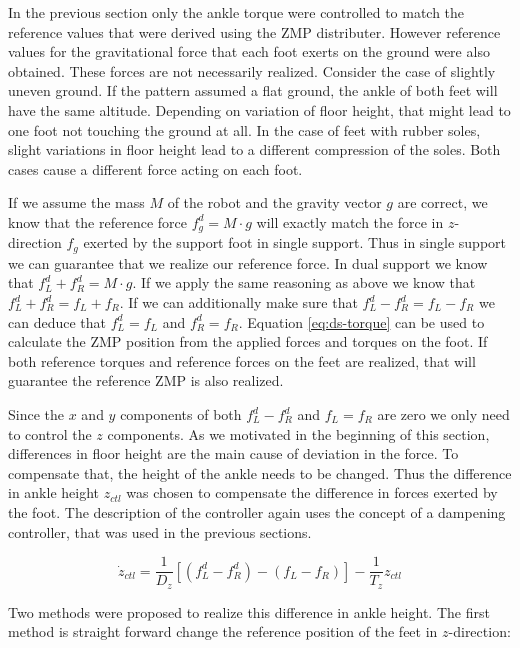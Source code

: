 \documentclass[english,ngerman]{KITreprt}
\begin{document}
In the previous section only the ankle torque were controlled to match
the reference values that were derived using the ZMP distributer.
However reference values for the gravitational force that each foot
exerts on the ground were also obtained. These forces are not
necessarily realized. Consider the case of slightly uneven ground. If
the pattern assumed a flat ground, the ankle of both feet will have the
same altitude. Depending on variation of floor height, that might lead
to one foot not touching the ground at all. In the case of feet with
rubber soles, slight variations in floor height lead to a different
compression of the soles. Both cases cause a different force acting on
each foot.

If we assume the mass $M$ of the robot and the gravity vector $g$ are
correct, we know that the reference force $f^d_g = M \cdot g$ will
exactly match the force in $z$-direction $f_g$ exerted by the support
foot in single support. Thus in single support we can guarantee that we
realize our reference force. In dual support we know that
$f^d_L + f^d_R = M \cdot g$. If we apply the same reasoning as above we
know that $f^d_L + f^d_R = f_L + f_R$. If we can additionally make sure
that $f^d_L - f^d_R = f_L - f_R$ we can deduce that $f^d_L = f_L$ and
$f^d_R = f_R$. Equation \ref{eq:ds-torque} can be used to calculate the
ZMP position from the applied forces and torques on the foot. If both
reference torques and reference forces on the feet are realized, that
will guarantee the reference ZMP is also realized.

Since the $x$ and $y$ components of both $f^d_L - f^d_R$ and $f_L = f_R$
are zero we only need to control the $z$ components. As we motivated in
the beginning of this section, differences in floor height are the main
cause of deviation in the force. To compensate that, the height of the
ankle needs to be changed. Thus the difference in ankle height $z_{ctl}$
was chosen to compensate the difference in forces exerted by the foot.
The description of the controller again uses the concept of a dampening
controller, that was used in the previous sections.

\begin{equation}
\dot{z}_{ctl} = \frac{1}{D_z} [(f^d_L - f^d_R) - (f_L - f_R)] - \frac{1}{T_z} z_{ctl}
\end{equation}

Two methods were proposed to realize this difference in ankle height.
The first method is straight forward change the reference position of
the feet in $z$-direction:
\end{document}
